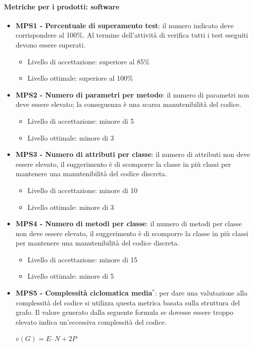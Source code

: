 \documentclass[11pt,a4paper]{article}
\begin{document}
{	\paragraph{Metriche per i prodotti: software} 
	\begin{itemize}
		\item \textbf{MPS1 - Percentuale di superamento test}: il numero indicato deve corrispondere al 100\%. Al termine dell'attività di verifica tutti i test eseguiti devono essere superati.
		\begin{itemize}
	 \item Livello di accettazione: superiore al 85\%
	 \item Livello ottimale: superiore al 100\%
	 \end{itemize}
	    \item \textbf{MPS2 - Numero di parametri per metodo}: il numero di parametri non deve essere elevato; la conseguenza è una scarsa manutenibilità del codice.
	    \begin{itemize}
	 \item Livello di accettazione: minore di 5
	 \item Livello ottimale: minore di 3
	 \end{itemize}
	    \item \textbf{MPS3 - Numero di attributi per classe}: il numero di attributi non deve essere elevato, il suggerimento è di scomporre la classe in più classi per mantenere una manutenibilità del codice discreta.
	    \begin{itemize}
	 \item Livello di accettazione: minore di 10
	 \item Livello ottimale: minore di 3
	 \end{itemize}
	    \item \textbf{MPS4 - Numero di metodi per classe}: il numero di metodi per classe non deve essere elevato, il suggerimento è di scomporre la classe in più classi per mantenere una manutenibilità del codice discreta.
	      \begin{itemize}
	 \item Livello di accettazione: minore di 15
	 \item Livello ottimale: minore di 5
	 \end{itemize}
	    \item \textbf{MPS5 - Complessità ciclomatica media$^*$}: per dare una valutazione alla complessità del codice si utilizza questa metrica basata sulla struttura del grafo. Il valore generato dalla seguente formula se dovesse essere troppo elevato indica un'eccessiva complessità del codice.
		\begin{center}
		$v(G) = E – N + 2P$
		\end{center}
    	

\end{itemize}}
\end{document}
